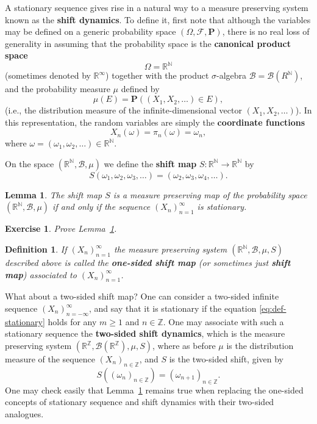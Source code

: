 \documentclass[12pt]{article}
\newtheorem{lem}[thm]{Lemma}
\newtheorem{defi}[thm]{Definition}
\newtheorem{exercise}[thm]{Exercise}
\newcommand{\R}{\mathbb{R}}
\newcommand{\Z}{\mathbb{Z}}
\newcommand{\N}{\mathbb{N}}
\newcommand{\prob}{\mathbf{P}}
\theoremstyle{example}
\begin{document}
A stationary sequence gives rise in a natural way to a measure preserving system known as the \textbf{shift dynamics}. To define it, first note that although the variables may be defined on a generic probability space $(\Omega, \mathcal{F},\prob)$, there is no real loss of generality in assuming that the probability space is the \textbf{canonical product space}
$$ \Omega = \R^\N $$
(sometimes denoted by $\R^\infty$) together with the product $\sigma$-algebra $\mathcal{B}=\mathcal{B}(R^\N)$, and the probability measure $\mu$ defined by
$$ \mu(E) = \prob( (X_1,X_2,\ldots) \in E ), $$
(i.e., the distribution measure of the infinite-dimensional vector $(X_1,X_2,\ldots)$). In this representation, the random variables are simply the \textbf{coordinate functions}
$$ X_n(\omega) = \pi_n(\omega) = \omega_n, $$
where $\omega=(\omega_1, \omega_2, \ldots) \in \R^\N$.

On the space $(\R^\N,\mathcal{B}, \mu)$ we define the \textbf{shift map} $S:\R^\N\to\R^\N$ by
$$ S(\omega_1,\omega_2, \omega_3, \ldots) = (\omega_2,\omega_3,\omega_4, \ldots). $$

\begin{lem} The shift map $S$ is a measure preserving map of the probability space $(\R^\N,\mathcal{B},\mu)$ if and only if the sequence $(X_n)_{n=1}^\infty$ is stationary.
\label{lem-shift-stationary}
\end{lem}

\begin{exercise} Prove Lemma~\ref{lem-shift-stationary}.
\end{exercise}

\begin{defi} If $(X_n)_{n=1}^\infty$ the measure preserving system $(\R^\N,\mathcal{B},\mu,S)$ described above is called the \textbf{one-sided shift map} (or sometimes just \textbf{shift map}) associated to $(X_n)_{n=1}^\infty$.
\end{defi}

What about a two-sided shift map? One can consider a two-sided infinite sequence $(X_n)_{n=-\infty}^\infty$, and say that it is stationary if the equation \eqref{eq:def-stationary} holds for any $m\ge1$ and $n\in\Z$. One may associate with such a stationary sequence the \textbf{two-sided shift dynamics}, which is the measure preserving system $(\R^\Z,\mathcal{B}(\R^\Z), \mu, S)$, where as before $\mu$ is the distribution measure of the sequence $(X_n)_{n\in\Z}$, and $S$ is the two-sided shift, given by
$$ S((\omega_n)_{n\in\Z}) = (\omega_{n+1})_{n\in\Z}. $$
One may check easily that Lemma~\ref{lem-shift-stationary} remains true when replacing the one-sided concepts of stationary sequence and shift dynamics with their two-sided analogues.
\end{document}
